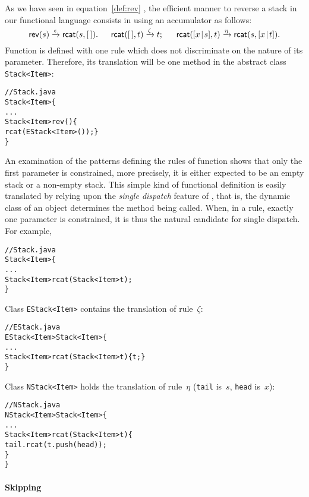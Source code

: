 As we have seen in equation~\eqref{def:rev} , the
efficient manner to reverse a stack in our functional language
consists in using an accumulator as follows:
\begin{equation*}
\textsf{rev}(s) \xrightarrow{\smash{\epsilon}}
             \textsf{rcat}(s,[\,]).\quad\;\;
\textsf{rcat}([\,],t) \xrightarrow{\smash{\zeta}} t;\quad\;\;
\textsf{rcat}([{x}\!\mid\!{s}],t) \xrightarrow{\smash{\eta}} 
                          \textsf{rcat}(s,[{x}\!\mid\!{t}]).
\end{equation*}
Function  is defined with one rule which does not
discriminate on the nature of its parameter. Therefore, its
translation will be one method in the abstract class
\texttt{Stack<Item>}:
\begin{alltt}
// Stack.java
\public \abstractX \class Stack<Item> \{
  ...
  \public Stack<Item> rev() \{
    \return rcat(\new EStack<Item>()); \}
\}
\end{alltt}
An examination of the patterns defining the rules of function
 shows that only the first parameter is constrained, more
precisely, it is either expected to be an empty stack or a
non\hyp{}empty stack. This simple kind of functional definition is
easily translated by relying upon the \emph{single dispatch} feature
of \Java, that is, the dynamic class of an object determines the
method being called. When, in a rule, exactly one parameter is
constrained, it is thus the natural candidate for single dispatch. For
example,
\begin{alltt}
// Stack.java
\public \abstractX \class Stack<Item> \{
  ...
  \public \abstractX Stack<Item> rcat(\final Stack<Item> t);
\}
\end{alltt}
Class \texttt{EStack<Item>} contains the translation of rule~\(\zeta\):
\begin{alltt}
// EStack.java
\public \final \class EStack<Item> \extends Stack<Item> \{
  ...
  \public Stack<Item> rcat(\final Stack<Item> t) \{ \return t; \}
\}
\end{alltt}
Class \texttt{NStack<Item>} holds the translation of rule~\(\eta\)
(\texttt{tail} is~\(s\), \texttt{head} is~\(x\)):
\begin{alltt}
// NStack.java
\public \final \class NStack<Item> \extends Stack<Item> \{
  ...
  \public Stack<Item> rcat(\final Stack<Item> t) \{
    \return tail.rcat(t.push(head));
  \}
\}
\end{alltt}

\paragraph{Skipping}


